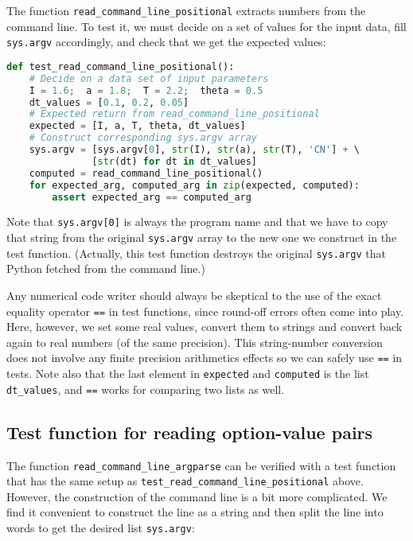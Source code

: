 \documentclass[graybox,sectrefs,envcountresetchap,open=right,final]{svmonodo}
\begin{document}
The function \Verb!read_command_line_positional! extracts numbers from the
command line. To test it, we must decide on a set of values for
the input data, fill \texttt{sys.argv}
accordingly, and check that we get the expected values:














\begin{lstlisting}[language=python,style=blue1_bluegreen]
def test_read_command_line_positional():
    # Decide on a data set of input parameters
    I = 1.6;  a = 1.8;  T = 2.2;  theta = 0.5
    dt_values = [0.1, 0.2, 0.05]
    # Expected return from read_command_line_positional
    expected = [I, a, T, theta, dt_values]
    # Construct corresponding sys.argv array
    sys.argv = [sys.argv[0], str(I), str(a), str(T), 'CN'] + \ 
               [str(dt) for dt in dt_values]
    computed = read_command_line_positional()
    for expected_arg, computed_arg in zip(expected, computed):
        assert expected_arg == computed_arg

\end{lstlisting}

Note that \texttt{sys.argv[0]} is always the program name and that we have to
copy that string from the original \texttt{sys.argv} array to the new one we
construct in the test function. (Actually, this test function destroys
the original \texttt{sys.argv} that Python fetched from the command line.)

Any numerical code writer should always be skeptical to the use of the exact
equality operator \texttt{==} in test functions, since round-off errors often
come into play. Here, however, we set some real values, convert them
to strings and convert back again to real numbers (of the same precision).
This string-number conversion does not involve any finite precision
arithmetics effects so we
can safely use \texttt{==} in tests. Note also that the last element in
\texttt{expected} and \texttt{computed} is the list \Verb!dt_values!, and \texttt{==} works
for comparing two lists as well.

\subsection{Test function for reading option-value pairs}

The function \Verb!read_command_line_argparse! can be verified with a
test function that has the same setup as \Verb!test_read_command_line_positional!
above.
However, the construction of the command line is a bit more complicated.
We find it convenient to construct the line as a string and then
split the line into words to get the desired list \texttt{sys.argv}:
\end{document}
